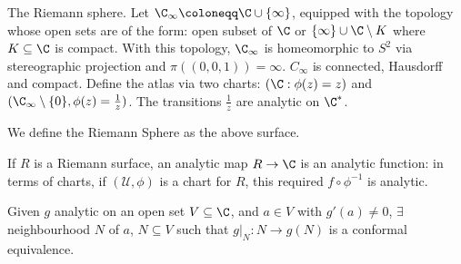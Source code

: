\documentclass{article}
\begin{document}
\begin{eg}
    The Riemann sphere.
    Let $\C_\infty \coloneqq \C \cup \{\infty\}$, equipped with the topology whose open sets are of the form: open subset of $\C$ or $\{\infty\} \cup \C \setminus K$ where $K \subseteq \C$ is compact.
    With this topology, $\C_\infty$ is homeomorphic to $S^2$ via stereographic projection and $\pi((0, 0, 1)) = \infty$.
    $C_\infty$ is connected, Hausdorff and compact.
    Define the atlas via two charts: $(\C: \phi(z) = z)$ and $(\C_\infty \setminus \{0\}, \phi(z) = \frac{1}{z})$.
    The transitions $\frac{1}{z}$ are analytic on $\C^*$.

    \begin{center}
    \end{center}
\end{eg}

\begin{defi}
    We define the Riemann Sphere as the above surface.
\end{defi}

\begin{defi}
    If $R$ is a Riemann surface, an analytic map $R \to \C$ is an analytic function: in terms of charts, if $(\mathcal{U}, \phi)$ is a chart for $R$, this required $f \circ \phi^{-1}$ is analytic.
\end{defi}

\begin{thm}
    Given $g$ analytic on an open set $V \subseteq \C$, and $a \in V$ with $g'(a) \neq 0$, $\exists$neighbourhood $N$ of $a$, $N \subseteq V$ such that $g|_N: N \to g(N)$ is a conformal equivalence.
\end{thm}
\end{document}
